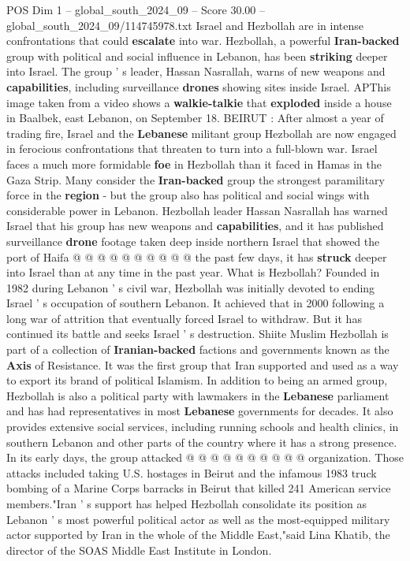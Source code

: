 \begin{textsample}{POS Dim 1 – global\_south\_2024\_09 – Score 30.00 – global\_south\_2024\_09/114745978.txt}  \label{ex:f1_pos_037}
Israel and Hezbollah are in intense confrontations that could \textbf{escalate} into war.
Hezbollah, a powerful \textbf{Iran-backed} group with political and social influence in Lebanon, has been \textbf{striking} deeper into Israel.
The group ' s leader, Hassan Nasrallah, warns of new weapons and \textbf{capabilities}, including surveillance \textbf{drones} showing sites inside Israel.
APThis image taken from a video shows a \textbf{walkie-talkie} that \textbf{exploded} inside a house in Baalbek, east Lebanon, on September 18.
BEIRUT : After almost a year of trading fire, Israel and the \textbf{Lebanese} militant group Hezbollah are now engaged in ferocious confrontations that threaten to turn into a full-blown war.
Israel faces a much more formidable \textbf{foe} in Hezbollah than it faced in Hamas in the Gaza Strip.
Many consider the \textbf{Iran-backed} group the strongest paramilitary force in the \textbf{region} - but the group also has political and social wings with considerable power in Lebanon.
Hezbollah leader Hassan Nasrallah has warned Israel that his group has new weapons and \textbf{capabilities}, and it has published surveillance \textbf{drone} footage taken deep inside northern Israel that showed the port of Haifa @ @ @ @ @ @ @ @ @ @ the past few days, it has \textbf{struck} deeper into Israel than at any time in the past year.
What is Hezbollah?
Founded in 1982 during Lebanon ' s civil war, Hezbollah was initially devoted to ending Israel ' s occupation of southern Lebanon.
It achieved that in 2000 following a long war of attrition that eventually forced Israel to withdraw.
But it has continued its battle and seeks Israel ' s destruction.
Shiite Muslim Hezbollah is part of a collection of \textbf{Iranian-backed} factions and governments known as the \textbf{Axis} of Resistance.
It was the first group that Iran supported and used as a way to export its brand of political Islamism.
In addition to being an armed group, Hezbollah is also a political party with lawmakers in the \textbf{Lebanese} parliament and has had representatives in most \textbf{Lebanese} governments for decades.
It also provides extensive social services, including running schools and health clinics, in southern Lebanon and other parts of the country where it has a strong presence.
In its early days, the group attacked @ @ @ @ @ @ @ @ @ @ organization.
Those attacks included taking U.S. hostages in Beirut and the infamous 1983 truck bombing of a Marine Corps barracks in Beirut that killed 241 American service members."Iran ' s support has helped Hezbollah consolidate its position as Lebanon ' s most powerful political actor as well as the most-equipped military actor supported by Iran in the whole of the Middle East,"said Lina Khatib, the director of the SOAS Middle East Institute in London.

\end{textsample}
